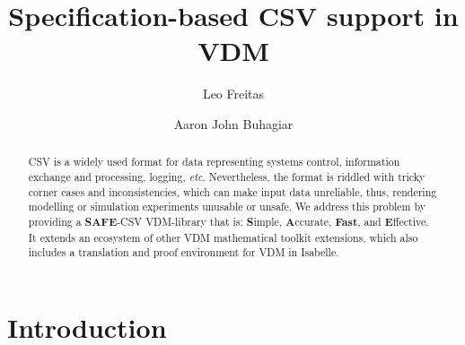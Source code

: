 \documentclass[runningheads,a4paper]{llncs}
\begin{document}
%



\title{Specification-based CSV support in VDM}

\author{Leo Freitas \and Aaron John Buhagiar
}
\authorrunning{ }

			
\maketitle
\setcounter{footnote}{0}
\begin{abstract}
CSV is a widely used format for data representing systems control, information exchange and processing, logging, \textit{etc}. Nevertheless, the format is riddled with tricky corner cases and inconsistencies, which can make input data unreliable, thus, rendering modelling or simulation experiments unusable or unsafe. We address this problem by providing a \textbf{SAFE}-CSV VDM-library that is: \textbf{S}imple, \textbf{A}ccurate, \textbf{Fast}, and \textbf{E}ffective. It extends an ecosystem of other VDM mathematical toolkit extensions, which also includes a translation and proof environment for VDM in Isabelle. 
\end{abstract}


\section{Introduction}\label{sec:intro}
\end{document}
